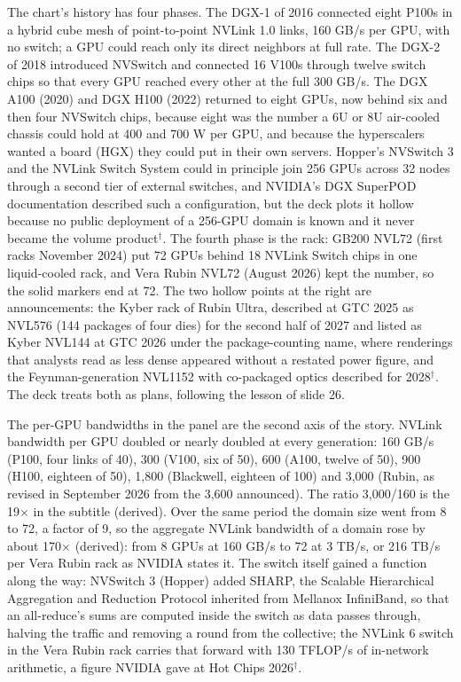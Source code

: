 \documentclass[11pt,letterpaper]{article}
\begin{document}
The chart's history has four phases. The DGX-1 of 2016 connected eight P100s in a hybrid cube mesh of point-to-point NVLink 1.0 links, 160 GB/s per GPU, with no switch; a GPU could reach only its direct neighbors at full rate. The DGX-2 of 2018 introduced NVSwitch and connected 16 V100s through twelve switch chips so that every GPU reached every other at the full 300 GB/s. The DGX A100 (2020) and DGX H100 (2022) returned to eight GPUs, now behind six and then four NVSwitch chips, because eight was the number a 6U or 8U air-cooled chassis could hold at 400 and 700 W per GPU, and because the hyperscalers wanted a board (HGX) they could put in their own servers. Hopper's NVSwitch 3 and the NVLink Switch System could in principle join 256 GPUs across 32 nodes through a second tier of external switches, and NVIDIA's DGX SuperPOD documentation described such a configuration, but the deck plots it hollow because no public deployment of a 256-GPU domain is known and it never became the volume product$^\dagger$. The fourth phase is the rack: GB200 NVL72 (first racks November 2024) put 72 GPUs behind 18 NVLink Switch chips in one liquid-cooled rack, and Vera Rubin NVL72 (August 2026) kept the number, so the solid markers end at 72. The two hollow points at the right are announcements: the Kyber rack of Rubin Ultra, described at GTC 2025 as NVL576 (144 packages of four dies) for the second half of 2027 and listed as Kyber NVL144 at GTC 2026 under the package-counting name, where renderings that analysts read as less dense appeared without a restated power figure, and the Feynman-generation NVL1152 with co-packaged optics described for 2028$^\dagger$. The deck treats both as plans, following the lesson of slide 26.

The per-GPU bandwidths in the panel are the second axis of the story. NVLink bandwidth per GPU doubled or nearly doubled at every generation: 160 GB/s (P100, four links of 40), 300 (V100, six of 50), 600 (A100, twelve of 50), 900 (H100, eighteen of 50), 1,800 (Blackwell, eighteen of 100) and 3,000 (Rubin, as revised in September 2026 from the 3,600 announced). The ratio 3,000/160 is the 19$\times$ in the subtitle (derived). Over the same period the domain size went from 8 to 72, a factor of 9, so the aggregate NVLink bandwidth of a domain rose by about 170$\times$ (derived): from 8 GPUs at 160 GB/s to 72 at 3 TB/s, or 216 TB/s per Vera Rubin rack as NVIDIA states it. The switch itself gained a function along the way: NVSwitch 3 (Hopper) added SHARP, the Scalable Hierarchical Aggregation and Reduction Protocol inherited from Mellanox InfiniBand, so that an all-reduce's sums are computed inside the switch as data passes through, halving the traffic and removing a round from the collective; the NVLink 6 switch in the Vera Rubin rack carries that forward with 130 TFLOP/s of in-network arithmetic, a figure NVIDIA gave at Hot Chips 2026$^\dagger$.
\end{document}
